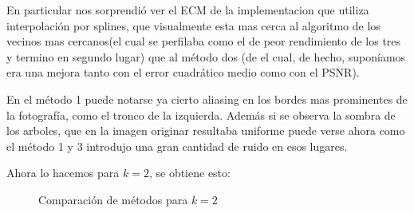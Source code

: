 En particular nos sorprendió ver el ECM de la implementacion que utiliza interpolación por splines, que visualmente esta mas cerca al algoritmo de los vecinos mas cercanos(el cual se perfilaba como el de peor rendimiento de los tres y termino en segundo lugar) que al método dos (de el cual, de hecho, suponíamos era una mejora tanto con el error cuadrático medio como con el PSNR).

En el método 1 puede notarse ya cierto aliasing en los bordes mas prominentes de la fotografía, como el tronco de la izquierda. Además si se observa la sombra de los arboles, que en la imagen originar resultaba uniforme puede verse ahora como el método 1 y 3 introdujo una gran cantidad de ruido en esos lugares.

Ahora lo hacemos para $k=2$, se obtiene esto:

\begin{figure}[H]
    \centering
    \qquad
    \qquad
    \caption{Comparación de métodos para $k = 2$}
    \label{fig:example}%
\end{figure}

